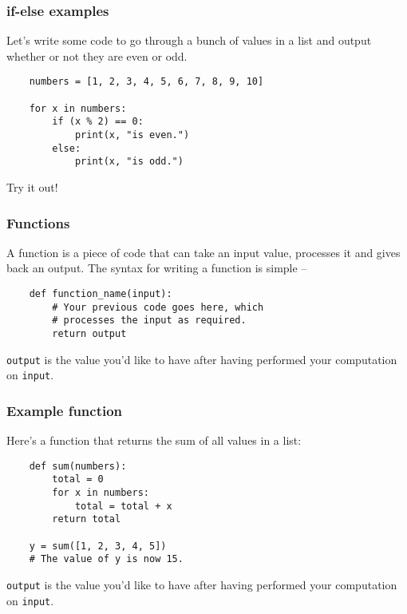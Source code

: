 \documentclass[notes]{beamer}
\begin{document}
\begin{frame}[fragile]
    \frametitle{if-else examples}

    Let's write some code to go through a bunch of values in a list and output whether or not they are even or odd.
    
    \pause
    \begin{lstlisting}
    numbers = [1, 2, 3, 4, 5, 6, 7, 8, 9, 10]

    for x in numbers:
        if (x % 2) == 0:
            print(x, "is even.")
        else:
            print(x, "is odd.")
    \end{lstlisting}
    \pause
    Try it out!
\end{frame}

\begin{frame}[fragile]
    \frametitle{Functions}
	A function is a piece of code that can take an input value, processes it and gives back an output. The syntax for writing a function is simple --
    \begin{lstlisting}
	def function_name(input):
	    # Your previous code goes here, which
	    # processes the input as required.
	    return output
    \end{lstlisting}
	{\tt output} is the value you'd like to have after having performed your computation on {\tt input}.
\end{frame}

\begin{frame}[fragile]
    \frametitle{Example function}
	Here's a function that returns the sum of all values in a list:
    \begin{lstlisting}
	def sum(numbers):
	    total = 0
        for x in numbers:
            total = total + x
	    return total

	y = sum([1, 2, 3, 4, 5])
	# The value of y is now 15.
    \end{lstlisting}
	{\tt output} is the value you'd like to have after having performed your computation on {\tt input}.
\end{frame}
\end{document}
